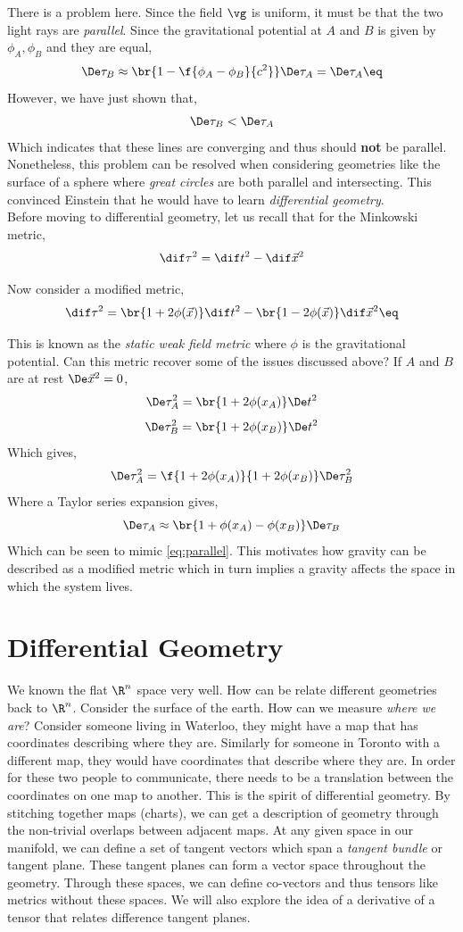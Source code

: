\documentclass{article}
\begin{document}
There is a problem here. Since the field $\vg$ is uniform, it must be that the two light rays are \textit{parallel}. Since the gravitational potential at $A$ and $B$ is given by $\phi_A, \phi_B$ and they are equal,
\[ \De \tau_B \approx \br{1 - \f{\phi_A - \phi_B}{c^2}} \De \tau_A = \De \tau_A \eq \label{eq:parallel} \]
However, we have just shown that,
\[ \De \tau_B < \De \tau_A \]
Which indicates that these lines are converging and thus should \textbf{not} be parallel. Nonetheless, this problem can be resolved when considering geometries like the surface of a sphere where \textit{great circles} are both parallel and intersecting. This convinced Einstein that he would have to learn \textit{differential geometry}. \\

Before moving to differential geometry, let us recall that for the Minkowski metric,
\[ \dif \tau^2 = \dif t^2 - \dif \vec{x}^2 \]

Now consider a modified metric,
\[ \dif \tau^2 = \br{1+2\phi(\vec{x})}\dif t^2 - \br{1-2\phi(\vec{x})}\dif \vec{x}^2 \eq \label{eq:modmetric}\]

This is known as the \textit{static weak field metric} where $\phi$ is the gravitational potential. Can this metric recover some of the issues discussed above? If $A$ and $B$ are at rest $\De \vec{x}^2 = 0$,
\[ \De \tau_A^2 = \br{1+2\phi(x_A)}\De t^2 \]
\[ \De \tau_B^2 = \br{1+2\phi(x_B)}\De t^2 \]
Which gives,
\[ \De \tau_A^2 = \f{1+2\phi(x_A)}{1+2\phi(x_B)}\De \tau_B^2 \]
Where a Taylor series expansion gives,
\[ \De \tau_A \approx \br{1+\phi(x_A)-\phi(x_B)}\De \tau_B \]
Which can be seen to mimic \eqref{eq:parallel}. This motivates how gravity can be described as a modified metric which in turn implies a gravity affects the space in which the system lives.

\section{Differential Geometry}

We known the flat $\R^n$ space very well. How can be relate different geometries back to $\R^n$. Consider the surface of the earth. How can we measure \textit{where we are}? Consider someone living in Waterloo, they might have a map that has coordinates describing where they are. Similarly for someone in Toronto with a different map, they would have coordinates that describe where they are. In order for these two people to communicate, there needs to be a translation between the coordinates on one map to another. This is the spirit of differential geometry. By stitching together maps (charts), we can get a description of geometry through the non-trivial overlaps between adjacent maps. At any given space in our manifold, we can define a set of tangent vectors which span a \textit{tangent bundle} or tangent plane. These tangent planes can form a vector space throughout the geometry. Through these spaces, we can define co-vectors and thus tensors like metrics without these spaces. We will also explore the idea of a derivative of a tensor that relates difference tangent planes.
\end{document}
